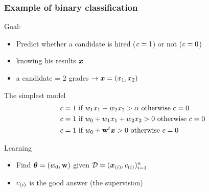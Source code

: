 \begin{frame}
  \frametitle{Example of binary classification}
  \begin{block}{Goal: }
    \begin{itemize}
    \item Predict whether a candidate is hired (${c} = 1$) or not
      (${c}=0$) 
    \item knowing his results $\boldsymbol{x}$
    \item a candidate = 2 grades $\rightarrow \boldsymbol{x} = (x_1, x_2)$
    \end{itemize}
  \end{block}
  \begin{block}{The simplest model}
    \begin{align*}
      {c} = 1 &\textrm{ if } w_1 x_1 + w_2 x_2 > \alpha \textrm{ otherwise } {c}=0\\
      {c} = 1 &\textrm{ if } w_0 + w_1 x_1 + w_2 x_2 > 0 \textrm{ otherwise }{c}=0\\
      {c} = 1 &\textrm{ if } w_0 + \mathbf{w}^t\boldsymbol{x} > 0 \textrm{ otherwise }{c}=0
    \end{align*}
    \end{block}
    \begin{block}{Learning}
      \begin{itemize}
      \item Find $\boldsymbol{\theta} =  (w_0, \mathbf{w})$ given $\mathcal{D} = (\boldsymbol{x}_{(i)}, {c}_{(i)} )_{i=1}^n$
      \item ${c}_{(i)}$ is the good answer (the supervision)
    \end{itemize}

  \end{block}
\end{frame}

